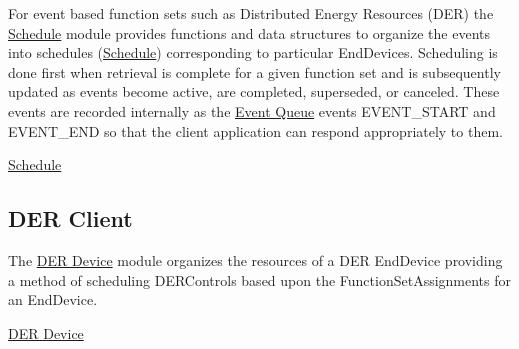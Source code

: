 For event based function sets such as Distributed Energy Resources (D\+ER) the \hyperlink{group__schedule}{Schedule} module provides functions and data structures to organize the events into schedules (\hyperlink{structSchedule}{Schedule}) corresponding to particular End\+Devices. Scheduling is done first when retrieval is complete for a given function set and is subsequently updated as events become active, are completed, superseded, or canceled. These events are recorded internally as the \hyperlink{group__event__queue}{Event Queue} events {\ttfamily E\+V\+E\+N\+T\+\_\+\+S\+T\+A\+RT} and {\ttfamily E\+V\+E\+N\+T\+\_\+\+E\+ND} so that the client application can respond appropriately to them.


\begin{DoxyItemize}
\item \hyperlink{group__schedule}{Schedule}
\end{DoxyItemize}

\subsection*{D\+ER Client }

The \hyperlink{group__der}{D\+ER Device} module organizes the resources of a D\+ER End\+Device providing a method of scheduling D\+E\+R\+Controls based upon the Function\+Set\+Assignments for an End\+Device.


\begin{DoxyItemize}
\item \hyperlink{group__der}{D\+ER Device} 
\end{DoxyItemize}